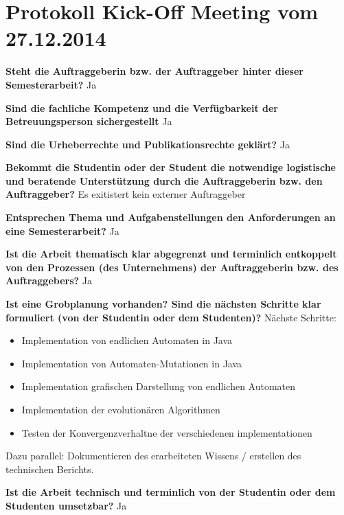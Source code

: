 \section{Protokoll Kick-Off Meeting vom 27.12.2014}
\textbf{Steht die Auftraggeberin bzw. der Auftraggeber hinter dieser Semesterarbeit?}\newline 
Ja

\textbf{Sind die fachliche Kompetenz und die Verfügbarkeit der Betreuungsperson sichergestellt}\newline 
Ja

\textbf{Sind die Urheberrechte und Publikationsrechte geklärt?}\newline 
Ja

\textbf{Bekommt die Studentin oder der Student die notwendige logistische und beratende Unterstützung durch die Auftraggeberin bzw. den Auftraggeber?}\newline 
Es exitistert kein externer Auftraggeber

\textbf{Entsprechen Thema und Aufgabenstellungen den Anforderungen an eine Semesterarbeit?}\newline 
Ja

\textbf{Ist die Arbeit thematisch klar abgegrenzt und terminlich entkoppelt von den Prozessen (des Unternehmens) der Auftraggeberin bzw. des Auftraggebers?}\newline 
Ja

\textbf{Ist eine Grobplanung vorhanden? Sind die nächsten Schritte klar formuliert (von der Studentin oder dem Studenten)?}\newline 
Nächste Schritte:\\
\begin{itemize}
	\item Implementation von endlichen Automaten in Java
	\item Implementation von Automaten-Mutationen in Java
	\item Implementation grafischen Darstellung von endlichen Automaten
	\item Implementation der evolutionären Algorithmen
	\item Testen der Konvergenzverhaltne der verschiedenen implementationen
\end{itemize}
Dazu parallel: Dokumentieren des erarbeiteten Wissens / erstellen des technischen Berichts.

\textbf{Ist die Arbeit technisch und terminlich von der Studentin oder dem Studenten umsetzbar?}\newline 
Ja